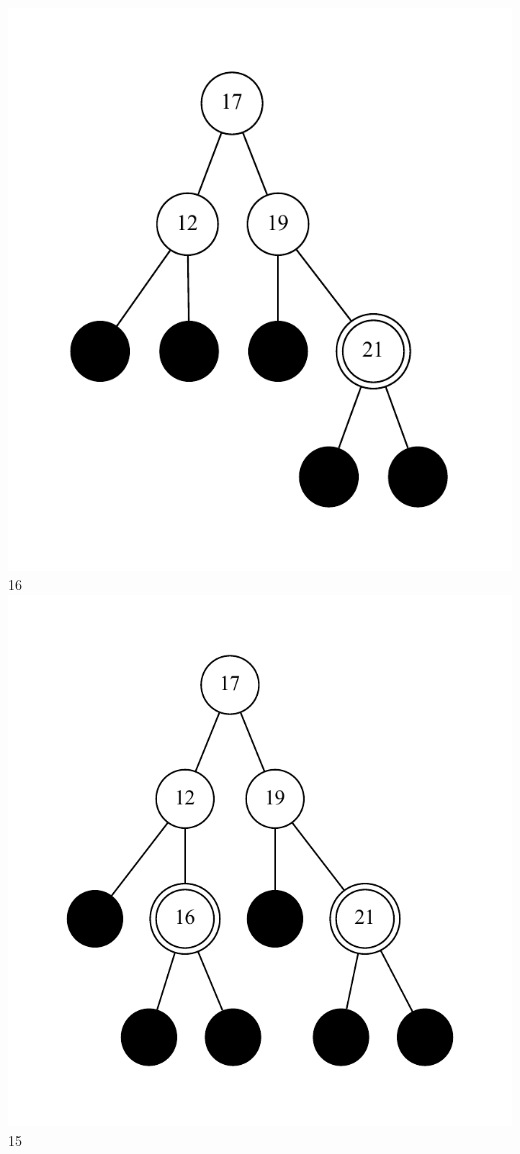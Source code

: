 \documentclass[11pt]{article}
\begin{document}
\includegraphics{step8.pdf}\\
	16\\
	
\includegraphics{step9.pdf}\\
	15\\
	
\end{document}
